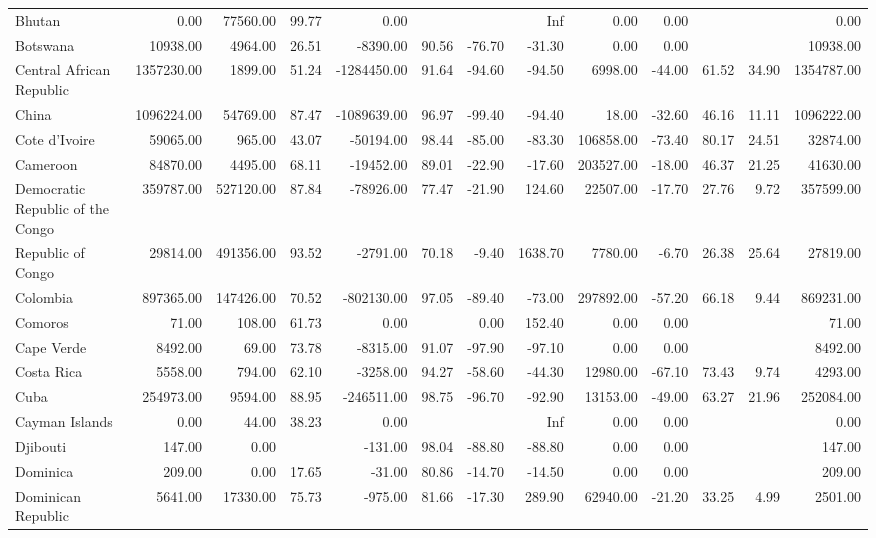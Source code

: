 \begin{table}[ht]
\begin{tabular}{lrrrrrrrrrrrr}
  Bhutan & 0.00 & 77560.00 & 99.77 & 0.00 &  &  & Inf & 0.00 & 0.00 &  &  & 0.00 \\ 
  Botswana & 10938.00 & 4964.00 & 26.51 & -8390.00 & 90.56 & -76.70 & -31.30 & 0.00 & 0.00 &  &  & 10938.00 \\ 
  Central African Republic & 1357230.00 & 1899.00 & 51.24 & -1284450.00 & 91.64 & -94.60 & -94.50 & 6998.00 & -44.00 & 61.52 & 34.90 & 1354787.00 \\ 
  China & 1096224.00 & 54769.00 & 87.47 & -1089639.00 & 96.97 & -99.40 & -94.40 & 18.00 & -32.60 & 46.16 & 11.11 & 1096222.00 \\ 
  Cote d'Ivoire & 59065.00 & 965.00 & 43.07 & -50194.00 & 98.44 & -85.00 & -83.30 & 106858.00 & -73.40 & 80.17 & 24.51 & 32874.00 \\ 
  Cameroon & 84870.00 & 4495.00 & 68.11 & -19452.00 & 89.01 & -22.90 & -17.60 & 203527.00 & -18.00 & 46.37 & 21.25 & 41630.00 \\ 
  Democratic Republic of the Congo & 359787.00 & 527120.00 & 87.84 & -78926.00 & 77.47 & -21.90 & 124.60 & 22507.00 & -17.70 & 27.76 & 9.72 & 357599.00 \\ 
  Republic of Congo & 29814.00 & 491356.00 & 93.52 & -2791.00 & 70.18 & -9.40 & 1638.70 & 7780.00 & -6.70 & 26.38 & 25.64 & 27819.00 \\ 
  Colombia & 897365.00 & 147426.00 & 70.52 & -802130.00 & 97.05 & -89.40 & -73.00 & 297892.00 & -57.20 & 66.18 & 9.44 & 869231.00 \\ 
  Comoros & 71.00 & 108.00 & 61.73 & 0.00 &  & 0.00 & 152.40 & 0.00 & 0.00 &  &  & 71.00 \\ 
  Cape Verde & 8492.00 & 69.00 & 73.78 & -8315.00 & 91.07 & -97.90 & -97.10 & 0.00 & 0.00 &  &  & 8492.00 \\ 
  Costa Rica & 5558.00 & 794.00 & 62.10 & -3258.00 & 94.27 & -58.60 & -44.30 & 12980.00 & -67.10 & 73.43 & 9.74 & 4293.00 \\ 
  Cuba & 254973.00 & 9594.00 & 88.95 & -246511.00 & 98.75 & -96.70 & -92.90 & 13153.00 & -49.00 & 63.27 & 21.96 & 252084.00 \\ 
  Cayman Islands & 0.00 & 44.00 & 38.23 & 0.00 &  &  & Inf & 0.00 & 0.00 &  &  & 0.00 \\ 
  Djibouti & 147.00 & 0.00 &  & -131.00 & 98.04 & -88.80 & -88.80 & 0.00 & 0.00 &  &  & 147.00 \\ 
  Dominica & 209.00 & 0.00 & 17.65 & -31.00 & 80.86 & -14.70 & -14.50 & 0.00 & 0.00 &  &  & 209.00 \\ 
  Dominican Republic & 5641.00 & 17330.00 & 75.73 & -975.00 & 81.66 & -17.30 & 289.90 & 62940.00 & -21.20 & 33.25 & 4.99 & 2501.00 \\ 

\end{tabular}
\end{table}
